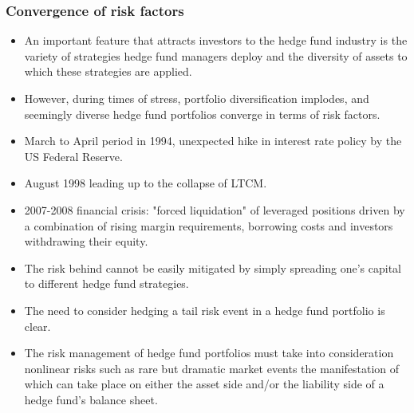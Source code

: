 \subsubsection{Convergence of risk factors}
\begin{itemize}
\item An important feature that attracts investors to the hedge fund industry is the variety of strategies hedge fund managers deploy and the diversity of assets to which these strategies are applied.
\item However, during times of stress, portfolio diversification implodes, and seemingly diverse hedge fund portfolios converge in terms of risk factors.
\item March to April period in 1994, unexpected hike in interest rate policy by the US Federal Reserve.
\item August 1998 leading up to the collapse of LTCM.
\item 2007-2008 financial crisis: "forced liquidation" of leveraged positions driven by a combination of rising margin requirements, borrowing costs and investors withdrawing their equity.
\item The risk behind cannot be easily mitigated by simply spreading one's capital to different hedge fund strategies.
\item The need to consider hedging a tail risk event in a hedge fund portfolio is clear.
\item The risk management of hedge fund portfolios must take into consideration nonlinear risks such as rare but dramatic market events the manifestation of which can take place on either the asset side and/or the liability side of a hedge fund's balance sheet.
\end{itemize}



